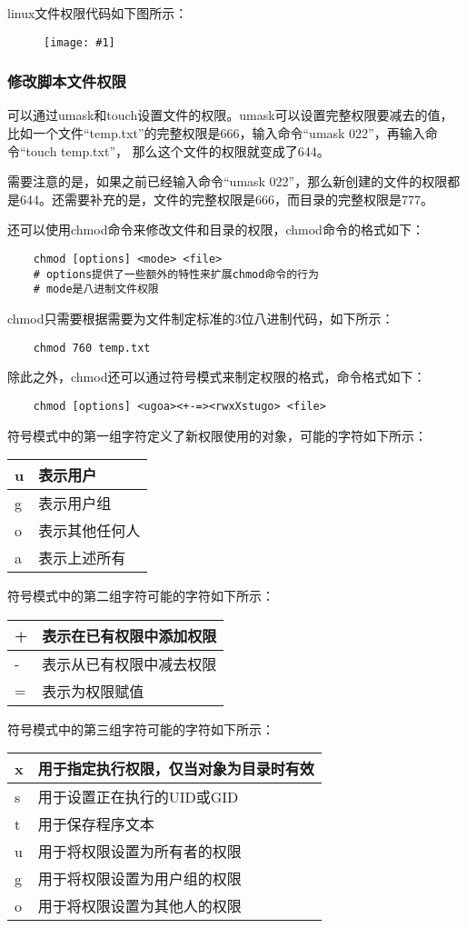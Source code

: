 \documentclass[a4paper,left=1.5cm,right=1.5cm,11pt]{article}
\newcommand{\fic}[1]{\begin{figure}[H]
		\center
		\texttt{[image: \#1]}
	\end{figure}}
\begin{document}
	linux文件权限代码如下图所示：
	\fic{2.png}

\subsubsection{修改脚本文件权限}
	可以通过umask和touch设置文件的权限。umask可以设置完整权限要减去的值，比如一个文件“temp.txt”的完整权限是666，输入命令“umask 022”，再输入命令“touch temp.txt”，
	那么这个文件的权限就变成了644。\par
	需要注意的是，如果之前已经输入命令“umask 022”，那么新创建的文件的权限都是644。还需要补充的是，文件的完整权限是666，而目录的完整权限是777。\par

	还可以使用chmod命令来修改文件和目录的权限，chmod命令的格式如下：
	\begin{lstlisting}
	chmod [options] <mode> <file>
	# options提供了一些额外的特性来扩展chmod命令的行为
	# mode是八进制文件权限
	\end{lstlisting}

	chmod只需要根据需要为文件制定标准的3位八进制代码，如下所示：
	\begin{lstlisting}
	chmod 760 temp.txt
	\end{lstlisting}

	除此之外，chmod还可以通过符号模式来制定权限的格式，命令格式如下：
	\begin{lstlisting}
	chmod [options] <ugoa><+-=><rwxXstugo> <file>
	\end{lstlisting}

	符号模式中的第一组字符定义了新权限使用的对象，可能的字符如下所示：
	\begin{longtable}{p{1.5cm}p{3cm}}
	\hline
	u & 表示用户 \\
	\hline
	g & 表示用户组 \\
	\hline
	o & 表示其他任何人 \\
	\hline
	a & 表示上述所有 \\
	\hline
	\end{longtable}

	符号模式中的第二组字符可能的字符如下所示：
	\begin{longtable}{p{1.5cm}p{6cm}}
	\hline
	+ & 表示在已有权限中添加权限 \\
	\hline
	- & 表示从已有权限中减去权限 \\
	\hline
	= & 表示为权限赋值 \\
	\hline
	\end{longtable}

	符号模式中的第三组字符可能的字符如下所示：
	\begin{longtable}{p{1.5cm}p{6cm}}
	\hline
	x & 用于指定执行权限，仅当对象为目录时有效 \\
	\hline
	s & 用于设置正在执行的UID或GID \\
	\hline
	t & 用于保存程序文本 \\
	\hline
	u & 用于将权限设置为所有者的权限 \\
	\hline
	g & 用于将权限设置为用户组的权限 \\
	\hline
	o & 用于将权限设置为其他人的权限 \\
	\hline
	\end{longtable}
\end{document}

